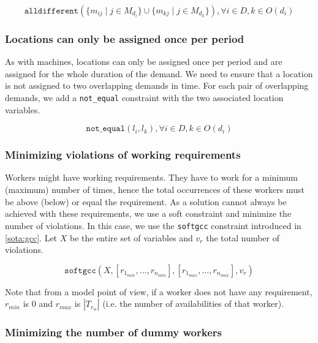 \documentclass[../../thesis.tex]{subfiles}
\begin{document}
\begin{equation}
  \label{}
  \texttt{alldifferent}(\{ m_{ij} \mid j \in M_{d_i} \} \cup \{ m_{kj} \mid j \in M_{d_k} \}), \forall i \in D, k \in O(d_i)
\end{equation}

\subsubsection{Locations can only be assigned once per period}

As with machines, locations can only be assigned once per period and are assigned for the whole duration of the demand. We need 
to ensure that a location is not assigned to two overlapping demands in time. For each pair of overlapping demands,
we add a \texttt{not_equal} constraint with the two associated location variables.

\begin{equation}
  \label{}
  \texttt{not_equal}(l_{i}, l_{k}), \forall i \in D, k \in O(d_i)
\end{equation}


\subsubsection{Minimizing violations of working requirements}

Workers might have working requirements. They have to work for a minimum (maximum) number of times, hence the total 
occurrences of these workers must be above (below) or equal the requirement. As a solution cannot always be 
achieved with these requirements, we use a soft constraint and minimize the number of violations. In this case,
we use the \texttt{softgcc} constraint introduced in \autoref{sota:gcc}. Let $X$ be the entire set of variables and 
$v_r$ the total number of violations.

\begin{equation}
  \texttt{softgcc}(X, [r_{1_{min}}, \dots, r_{n_{min}}], [r_{1_{max}}, \dots, r_{n_{max}}], v_{r}) \label{cp:wrequirements} 
\end{equation}

Note that from a model point of view, if a worker does not have any requirement, $r_{min}$ is 0 and $r_{max}$ is $|T_{r_w}| $ (i.e. the number of availabilities of that worker).


\subsubsection{Minimizing the number of dummy workers}
\end{document}
